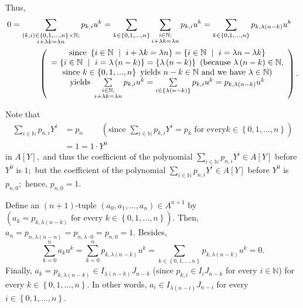 \documentclass[12pt,final,notitlepage,onecolumn]{article}%
\begin{document}
Thus,%
\begin{align*}
0  &  =\sum\limits_{\substack{\left(  k,i\right)  \in\left\{
0,1,...,n\right\}  \times\mathbb{N};\\i+\lambda k=\lambda n}}p_{k,i}u^{k}%
=\sum\limits_{k\in\left\{  0,1,...,n\right\}  }\sum_{\substack{i\in
\mathbb{N};\\i+\lambda k=\lambda n}}p_{k,i}u^{k}=\sum\limits_{k\in\left\{
0,1,...,n\right\}  }p_{k,\lambda\left(  n-k\right)  }u^{k}\\
&  \ \ \ \ \ \ \ \ \ \ \left(
\begin{array}
[c]{c}%
\text{since }\left\{  i\in\mathbb{N}\text{\ }\mid\ i+\lambda k=\lambda
n\right\}  =\left\{  i\in\mathbb{N}\ \mid\ i=\lambda n-\lambda k\right\} \\
=\left\{  i\in\mathbb{N}\ \mid\ i=\lambda\left(  n-k\right)  \right\}
=\left\{  \lambda\left(  n-k\right)  \right\}  \text{ (because }\lambda\left(
n-k\right)  \in\mathbb{N}\text{,}\\
\text{since }k\in\left\{  0,1,...,n\right\}  \text{ yields }n-k\in
\mathbb{N}\text{ and we have }\lambda\in\mathbb{N}\text{)}\\
\text{yields }\sum\limits_{\substack{i\in\mathbb{N};\\i+\lambda k=\lambda
n}}p_{k,i}u^{k}=\sum\limits_{i\in\left\{  \lambda\left(  n-k\right)  \right\}
}p_{k,i}u^{k}=p_{k,\lambda\left(  n-k\right)  }u^{k}%
\end{array}
\right)  .
\end{align*}


Note that%
\begin{align*}
\sum\limits_{i\in\mathbb{N}}p_{n,i}Y^{i}  &  =p_{n}\ \ \ \ \ \ \ \ \ \ \left(
\text{since }\sum\limits_{i\in\mathbb{N}}p_{k,i}Y^{i}=p_{k}\text{ for every
}k\in\left\{  0,1,...,n\right\}  \right) \\
&  =1=1\cdot Y^{0}%
\end{align*}
in $A\left[  Y\right]  ,$ and thus the coefficient of the polynomial
$\sum\limits_{i\in\mathbb{N}}p_{n,i}Y^{i}\in A\left[  Y\right]  $ before
$Y^{0}$ is $1;$ but the coefficient of the polynomial $\sum\limits_{i\in
\mathbb{N}}p_{n,i}Y^{i}\in A\left[  Y\right]  $ before $Y^{0}$ is $p_{n,0};$
hence, $p_{n,0}=1$.

Define an $\left(  n+1\right)  $-tuple $\left(  a_{0},a_{1},...,a_{n}\right)
\in A^{n+1}$ by $\left(  a_{k}=p_{k,\lambda\left(  n-k\right)  }\text{ for
every }k\in\left\{  0,1,...,n\right\}  \right)  .$ Then, $a_{n}=p_{n,\lambda
\left(  n-n\right)  }=p_{n,\lambda\cdot0}=p_{n,0}=1$. Besides,%
\[
\sum\limits_{k=0}^{n}a_{k}u^{k}=\sum\limits_{k=0}^{n}p_{k,\lambda\left(
n-k\right)  }u^{k}=\sum\limits_{k\in\left\{  0,1,...,n\right\}  }%
p_{k,\lambda\left(  n-k\right)  }u^{k}=0.
\]
Finally, $a_{k}=p_{k,\lambda\left(  n-k\right)  }\in I_{\lambda\left(
n-k\right)  }J_{n-k}$ (since $p_{k,i}\in I_{i}J_{n-k}$ for every
$i\in\mathbb{N}$) for every $k\in\left\{  0,1,...,n\right\}  $. In other
words, $a_{i}\in I_{\lambda\left(  n-i\right)  }J_{n-i}$ for every
$i\in\left\{  0,1,...,n\right\}  $.
\end{document}
